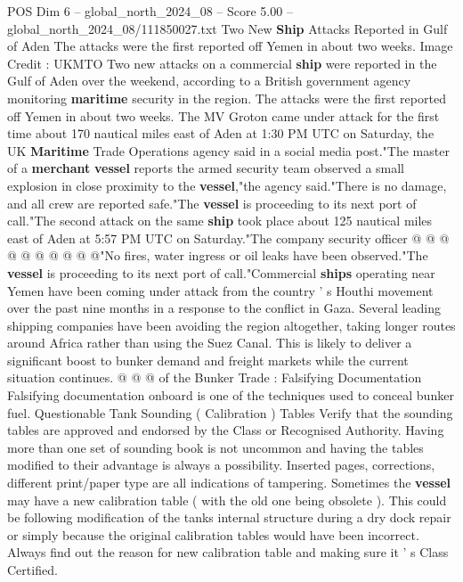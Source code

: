 \begin{textsample}{POS Dim 6 – global\_north\_2024\_08 – Score 5.00 – global\_north\_2024\_08/111850027.txt}  \label{ex:f6_pos_376}
Two New \textbf{Ship} Attacks Reported in Gulf of Aden The attacks were the first reported off Yemen in about two weeks.
Image Credit : UKMTO Two new attacks on a commercial \textbf{ship} were reported in the Gulf of Aden over the weekend, according to a British government agency monitoring \textbf{maritime} security in the region.
The attacks were the first reported off Yemen in about two weeks.
The MV Groton came under attack for the first time about 170 nautical miles east of Aden at 1:30 PM UTC on Saturday, the UK \textbf{Maritime} Trade Operations agency said in a social media post."The master of a \textbf{merchant} \textbf{vessel} reports the armed security team observed a small explosion in close proximity to the \textbf{vessel},"the agency said."There is no damage, and all crew are reported safe."The \textbf{vessel} is proceeding to its next port of call."The second attack on the same \textbf{ship} took place about 125 nautical miles east of Aden at 5:57 PM UTC on Saturday."The company security officer @ @ @ @ @ @ @ @ @ @"No fires, water ingress or oil leaks have been observed."The \textbf{vessel} is proceeding to its next port of call."Commercial \textbf{ships} operating near Yemen have been coming under attack from the country ' s Houthi movement over the past nine months in a response to the conflict in Gaza.
Several leading shipping companies have been avoiding the region altogether, taking longer routes around Africa rather than using the Suez Canal.
This is likely to deliver a significant boost to bunker demand and freight markets while the current situation continues. @ @ @ of the Bunker Trade : Falsifying Documentation Falsifying documentation onboard is one of the techniques used to conceal bunker fuel.
Questionable Tank Sounding ( Calibration ) Tables Verify that the sounding tables are approved and endorsed by the Class or Recognised Authority.
Having more than one set of sounding book is not uncommon and having the tables modified to their advantage is always a possibility.
Inserted pages, corrections, different print/paper type are all indications of tampering.
Sometimes the \textbf{vessel} may have a new calibration table ( with the old one being obsolete ).
This could be following modification of the tanks internal structure during a dry dock repair or simply because the original calibration tables would have been incorrect.
Always find out the reason for new calibration table and making sure it ' s Class Certified.

\end{textsample}
